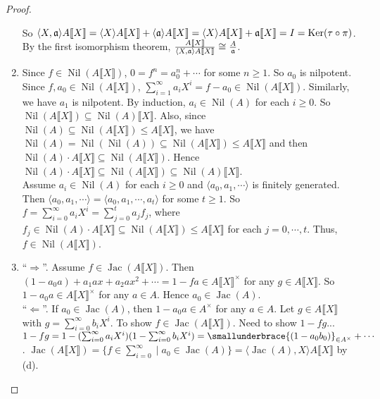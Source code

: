 \begin{proof}
\begin{enumerate}
            So $\langle X,\mathfrak{a} \rangle A\llbracket X \rrbracket = \langle X \rangle A \llbracket X \rrbracket + \langle \mathfrak{a} \rangle A\llbracket X \rrbracket = \langle X \rangle A\llbracket X \rrbracket + \mathfrak{a} \llbracket X \rrbracket = I = \operatorname{Ker}(\tau \circ \pi)$. By the first isomorphism theorem, $\frac{A\llbracket X \rrbracket}{\langle X,\mathfrak{a} \rangle A \llbracket X \rrbracket} \cong \frac{A}{\mathfrak{a}}$. 
        \item 
            Since $f \in \operatorname{Nil}(A\llbracket X \rrbracket)$, $0 = f^n = a_0^n + \cdots $ for some $n \geq 1$. So $a_0$ is nilpotent. Since $f,a_0 \in \operatorname{Nil}(A \llbracket X \rrbracket)$, $\sum_{i=1}^\infty a_iX^i = f-a_0 \in \operatorname{Nil}(A \llbracket X \rrbracket)$. Similarly, we have $a_1$ is nilpotent. By induction, $a_i \in \operatorname{Nil}(A)$ for each $i \geq 0$. So $\operatorname{Nil}(A\llbracket X \rrbracket) \subseteq \operatorname{Nil}(A)\llbracket X \rrbracket$. Also, since $\operatorname{Nil}(A) \subseteq \operatorname{Nil}(A\llbracket X \rrbracket) \leq A \llbracket X \rrbracket$, we have $\operatorname{Nil}(A) = \operatorname{Nil}(\operatorname{Nil}(A)) \subseteq \operatorname{Nil}(A\llbracket X \rrbracket) \leq A\llbracket X \rrbracket$ and then $\operatorname{Nil}(A) \cdot A\llbracket X \rrbracket \subseteq \operatorname{Nil}(A\llbracket X \rrbracket)$. Hence $\operatorname{Nil}(A) \cdot A\llbracket X \rrbracket \subseteq \operatorname{Nil}(A\llbracket X \rrbracket) \subseteq \operatorname{Nil}(A)\llbracket X \rrbracket$. \\
            Assume $a_i \in \operatorname{Nil}(A)$ for each $i \geq 0$ and $\langle a_0,a_1,\cdots \rangle$ is finitely generated. Then $\langle a_0,a_1,\cdots \rangle = \langle a_0,a_1,\cdots,a_t \rangle$ for some $t \geq 1$. So $f = \sum_{i=0}^\infty a_iX^i = \sum_{j=0}^t a_jf_j$, where $f_j \in \operatorname{Nil}(A) \cdot A \llbracket X \rrbracket \subseteq \operatorname{Nil}(A\llbracket X \rrbracket) \leq A\llbracket X \rrbracket$ for each $j = 0,\cdots,t$. Thus, $f \in \operatorname{Nil}(A\llbracket X \rrbracket)$. 
        \item  ``$\Rightarrow$''. Assume $f \in \operatorname{Jac}(A\llbracket X \rrbracket)$. Then $(1-a_0a) + a_1ax + a_2ax^2 + \cdots = 1-fa \in A\llbracket X \rrbracket^\times$ for any $g \in A\llbracket X \rrbracket$. So $1-a_0a \in A\llbracket X \rrbracket^\times$ for any $a \in A$. Hence $a_0 \in \operatorname{Jac}(A)$. \\
            ``$\Leftarrow$''. If $a_0 \in \operatorname{Jac}(A)$, then $1-a_0a \in A^\times$ for any $a \in A$. Let $g \in A\llbracket X \rrbracket$ with $g = \sum_{i=0}^\infty b_iX^i$. To show $f \in \operatorname{Jac}(A\llbracket X \rrbracket)$. Need to show $1-fg$... $1-fg = 1-(\sum_{i=0}^\infty a_iX^i)(1-\sum_{i=0}^\infty b_iX^i) = \smallunderbrace{(1-a_0b_0)}_{\in A^\times} + \cdots$. $\operatorname{Jac}(A\llbracket X \rrbracket) = \{f \in \sum_{i=0}^\infty \mid a_0 \in \operatorname{Jac}(A)\} = \langle \operatorname{Jac}(A),X \rangle A \llbracket X \rrbracket$ by (d). 

\end{enumerate}
\end{proof}

